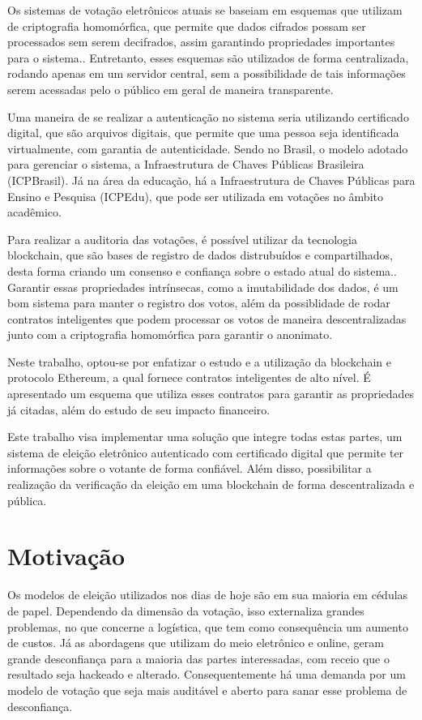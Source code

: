 \documentclass{ufsctex/ufsctex}
\begin{document}
Os sistemas de votação eletrônicos atuais se baseiam em esquemas que utilizam de criptografia
homomórfica, que permite que dados cifrados possam ser processados sem serem decifrados, assim
garantindo propriedades importantes para o sistema.\cite{springer}. Entretanto, esses esquemas
são utilizados de forma centralizada, rodando apenas em um servidor central, sem a possibilidade
de tais informações serem acessadas pelo o público em geral de maneira transparente.

Uma maneira de se realizar a autenticação no sistema seria utilizando certificado
digital, que são arquivos digitais, que permite que uma pessoa seja identificada
virtualmente, com garantia de autenticidade\cite{pki}. Sendo no Brasil, o modelo adotado para
gerenciar o sistema, a Infraestrutura de Chaves Públicas Brasileira (ICPBrasil). Já na área
da educação, há a Infraestrutura de Chaves Públicas para Ensino e Pesquisa (ICPEdu), que
pode ser utilizada em votações no âmbito acadêmico.

Para realizar a auditoria das votações, é possível utilizar da tecnologia
blockchain, que são bases de registro de dados distrubuídos e compartilhados,
desta forma criando um consenso e confiança sobre o estado atual do sistema.\cite{nakamoto2012bitcoin}.
Garantir essas propriedades intrínsecas, como a imutabilidade dos
dados, é um bom sistema para manter o registro dos votos, além da possiblidade de rodar
contratos inteligentes que podem processar os votos de maneira descentralizadas junto
com a criptografia homomórfica para garantir o anonimato.

Neste trabalho, optou-se por enfatizar o estudo e a utilização da blockchain e protocolo
Ethereum, a qual fornece contratos inteligentes de alto nível\cite{ethereum}.
É apresentado um esquema que utiliza esses contratos para garantir as propriedades já citadas,
além do estudo de seu impacto financeiro.

Este trabalho visa implementar uma solução que integre todas estas partes, um sistema
de eleição eletrônico autenticado com certificado digital que permite ter informações
sobre o votante de forma confiável. Além disso, possibilitar a realização da verificação
da eleição em uma blockchain de forma descentralizada e pública.

\section{Motivação}

Os modelos de eleição utilizados nos dias de hoje são em sua maioria em cédulas
de papel. Dependendo da dimensão da votação, isso externaliza grandes problemas,
no que concerne a logística, que tem como consequência um aumento de custos. Já
as abordagens que utilizam do meio eletrônico e online, geram grande desconfiança
para a maioria das partes interessadas, com receio que o resultado seja hackeado
e alterado. Consequentemente há uma demanda por um modelo de votação que seja
mais auditável e aberto para sanar esse problema de desconfiança.
\end{document}
